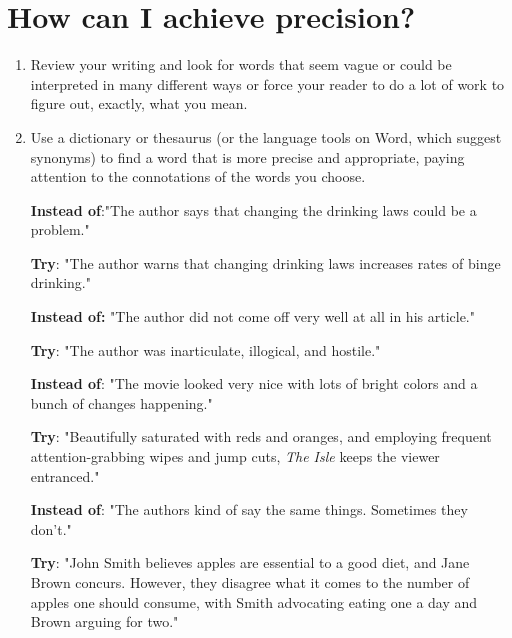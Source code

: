 \section{How can I achieve precision?}
 
 \begin{enumerate}

\item Review your writing and look for words that seem vague or could be interpreted 
in many different ways or force your reader to do a lot of work to figure out, exactly, 
what you mean.
 
\item Use a dictionary or thesaurus (or the language tools on Word, which suggest 
synonyms)  to find a word that is more precise and appropriate, paying attention to 
the connotations of the words you choose.
 
 

\textbf{Instead of}:"The author says that changing the drinking laws could be a 
problem."
 
\textbf{Try}:	"The author warns that changing drinking laws increases rates of 
binge drinking."
 
\textbf{Instead of:}	"The author did not come off very well at all in his article."
 
        	\textbf{Try}:	"The author was inarticulate, illogical, and hostile."
 
\textbf{Instead of}:	"The movie looked very nice with lots of bright colors and a 
bunch of changes happening."
 
        	\textbf{Try}:   "Beautifully saturated with reds and oranges, and employing 
frequent attention-grabbing  wipes and jump cuts, \emph{The Isle} keeps the 
viewer entranced."
 
\textbf{Instead of}:   "The authors kind of say the same things. Sometimes they don't."
 
\textbf{Try}:  "John Smith believes apples are essential to a good diet, and Jane Brown concurs. However, they disagree what it comes to the number of apples one should consume, with Smith advocating eating one a day and Brown arguing for two."


\end{enumerate}


